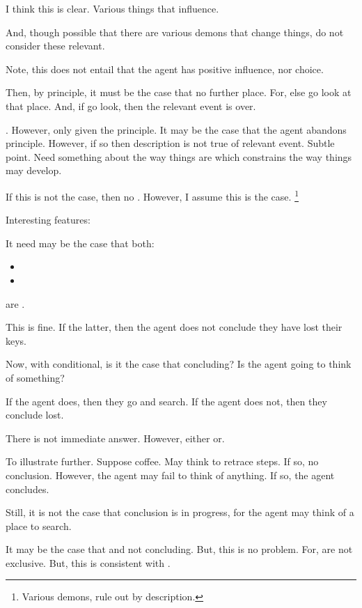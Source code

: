 \begin{note}
{    I think this is clear.
    Various things that influence.

    And, though possible that there are various demons that change things, do not consider these relevant.

    Note, this does not entail that the agent has positive influence, nor choice.
  }
  Then, by principle, it must be the case that no further place.
  For, else go look at that place.
  And, if go look, then the relevant event is over.

  .
  However, only given the principle.
  It may be the case that the agent abandons principle.
  However, if so then description is not true of relevant event.
  Subtle point.
  Need something about the way things are which constrains the way things may develop.

  If this is not the case, then no .
  However, I assume this is the case.%
  \footnote{
    Various demons, rule out by description.
  }
\end{note}

\begin{note}
  Interesting features:

  \begin{observation}
    It need may be the case that both:
    \begin{itemize}
    \item
    \item
    \end{itemize}
    are .
  \end{observation}

  This is fine.
  If the latter, then the agent does not conclude they have lost their keys.

  Now, with conditional, is it the case that concluding?
  Is the agent going to think of something?

  If the agent does, then they go and search.
  If the agent does not, then they conclude lost.

  There is not immediate answer.
  However, either or.

  To illustrate further.
  Suppose coffee.
  May think to retrace steps.
  If so, no conclusion.
  However, the agent may fail to think of anything.
  If so, the agent concludes.

  Still, it is not the case that conclusion is in progress, for the agent may think of a place to search.

  It may be the case that \fc{} and not concluding.
  But, this is no problem.
  For,  are not exclusive.
  But, this is consistent with \requ{}.
\end{note}


